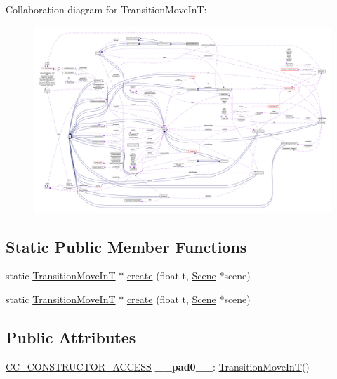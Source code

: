 Collaboration diagram for Transition\+Move\+InT\+:
\nopagebreak
\begin{figure}[H]
\begin{center}
\leavevmode
\includegraphics[width=350pt]{classTransitionMoveInT__coll__graph}
\end{center}
\end{figure}
\subsection*{Static Public Member Functions}
\begin{DoxyCompactItemize}
\item 
static \hyperlink{classTransitionMoveInT}{Transition\+Move\+InT} $\ast$ \hyperlink{classTransitionMoveInT_aad3abc7f25bf1fa49f9b358e984b80f0}{create} (float t, \hyperlink{classScene}{Scene} $\ast$scene)
\item 
static \hyperlink{classTransitionMoveInT}{Transition\+Move\+InT} $\ast$ \hyperlink{classTransitionMoveInT_a5f8087bbe5841fcf1f0198bb293ca600}{create} (float t, \hyperlink{classScene}{Scene} $\ast$scene)
\end{DoxyCompactItemize}
\subsection*{Public Attributes}
\begin{DoxyCompactItemize}
\item 
\mbox{\label{classTransitionMoveInT_a0948ad9bb04a13ce951c6741b8f1b392}} 
\hyperlink{_2cocos2d_2cocos_2base_2ccConfig_8h_a25ef1314f97c35a2ed3d029b0ead6da0}{C\+C\+\_\+\+C\+O\+N\+S\+T\+R\+U\+C\+T\+O\+R\+\_\+\+A\+C\+C\+E\+SS} {\bfseries \+\_\+\+\_\+pad0\+\_\+\+\_\+}\+: \hyperlink{classTransitionMoveInT}{Transition\+Move\+InT}()
\end{DoxyCompactItemize}
